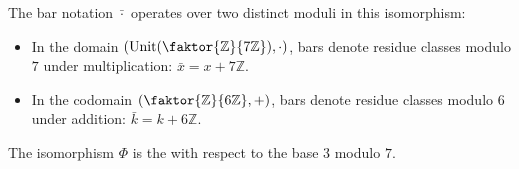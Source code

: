 \begin{content}
\begin{steps}
The bar notation $\bar{\cdot}$ operates over two distinct moduli in this isomorphism:
\begin{itemize}
    \item In the domain $(\operatorname{Unit}(\faktor{\mathbb{Z}}{7\mathbb{Z}}), \cdot)$, bars denote residue classes modulo $7$ under multiplication: $\bar{x} = x + 7\mathbb{Z}$.
    \item In the codomain $(\faktor{\mathbb{Z}}{6\mathbb{Z}}, +)$, bars denote residue classes modulo $6$ under addition: $\bar{k} = k + 6\mathbb{Z}$.
\end{itemize}
The isomorphism $\Phi$ is the  with respect to the base $3$ modulo $7$.
\end{steps}
\end{content}

